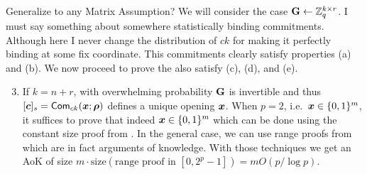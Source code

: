 {\color{red} Generalize to any Matrix Assumption?}
We will consider the case $\mathbf{{G}}\gets\mathbb{Z}_q^{k\times r}$. {\color{red} I must say something about somewhere statistically binding commitments. Although here I never change the distribution of $ck$ for making it perfectly binding at some fix coordinate.} 
This commitments clearly satisfy properties (a) and (b). We now proceed to prove the also satisfy (c), (d), and (e).
\begin{enumerate}[label=(\alph*)]
\setcounter{enumi}{2}
\item If $k=n+r$, with overwhelming probability $\mathbf{{G}}$ is invertible and thus $[{\boldsymbol{c}}]_s=\mathsf{Com}_{ck}({\boldsymbol{x}};{\boldsymbol{\rho}})$ defines a unique opening ${\boldsymbol{x}}$. When $p=2$, i.e.~${\boldsymbol{x}}\in\{0,1\}^m$, it suffices to prove that indeed ${\boldsymbol{x}}\in\{0,1\}^m$ which can be done using the constant size proof from \cite{AC:GonHevRaf15}. In the general case, we can use range proofs from \cite{ACNS:GonRaf16} which are in fact arguments of knowledge. With those techniques we get an AoK of size $m\cdot\mathrm{size}(\text{range proof in }[0,2^p-1])=mO(p/\log p)$.


\end{enumerate}

